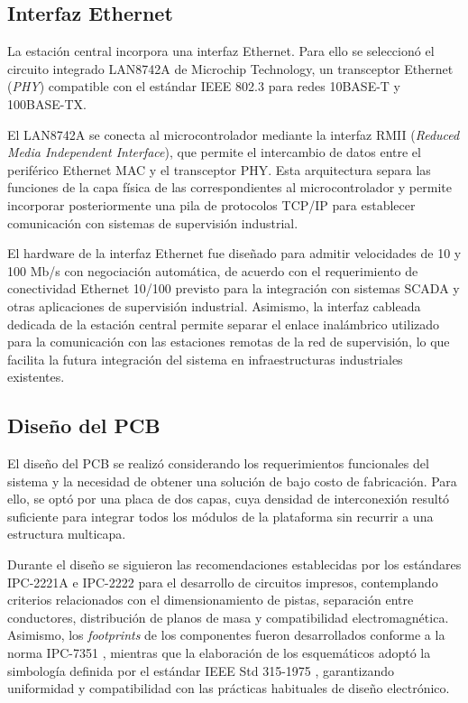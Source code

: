 \subsection{Interfaz Ethernet}

La estación central incorpora una interfaz Ethernet. Para ello se seleccionó el circuito integrado LAN8742A de Microchip Technology, un transceptor Ethernet (\textit{PHY}) compatible con el estándar IEEE 802.3 \cite{ieee8023} para redes 10BASE-T y 100BASE-TX.

El LAN8742A se conecta al microcontrolador mediante la interfaz RMII (\textit{Reduced Media Independent Interface}), que permite el intercambio de datos entre el periférico Ethernet MAC y el transceptor PHY. Esta arquitectura separa las funciones de la capa física de las correspondientes al microcontrolador y permite incorporar posteriormente una pila de protocolos TCP/IP para establecer comunicación con sistemas de supervisión industrial.

El hardware de la interfaz Ethernet fue diseñado para admitir velocidades de 10 y 100 Mb/s con negociación automática, de acuerdo con el requerimiento de conectividad Ethernet 10/100 previsto para la integración con sistemas SCADA y otras aplicaciones de supervisión industrial. Asimismo, la interfaz cableada dedicada de la estación central permite separar el enlace inalámbrico utilizado para la comunicación con las estaciones remotas de la red de supervisión, lo que facilita la futura integración del sistema en infraestructuras industriales existentes.

\subsection{Diseño del PCB}

El diseño del PCB se realizó considerando los requerimientos funcionales del sistema y la necesidad de obtener una solución de bajo costo de fabricación. Para ello, se optó por una placa de dos capas, cuya densidad de interconexión resultó suficiente para integrar todos los módulos de la plataforma sin recurrir a una estructura multicapa.

Durante el diseño se siguieron las recomendaciones establecidas por los estándares IPC-2221A \cite{ipc2221a} e IPC-2222 \cite{ipc2222} para el desarrollo de circuitos impresos, contemplando criterios relacionados con el dimensionamiento de pistas, separación entre conductores, distribución de planos de masa y compatibilidad electromagnética. Asimismo, los \textit{footprints} de los componentes fueron desarrollados conforme a la norma IPC-7351 \cite{ipc7351}, mientras que la elaboración de los esquemáticos adoptó la simbología definida por el estándar IEEE Std 315-1975 \cite{ieee315}, garantizando uniformidad y compatibilidad con las prácticas habituales de diseño electrónico.

